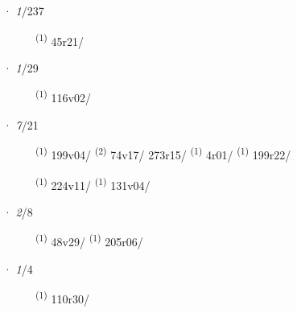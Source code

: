 \ENTRYEND
\noindent{} · \textit{1}/237 \LEMMALINE
\begin{description}
    \item[]  \textsuperscript{(1)} \mbox{45r21/}
\end{description}
\ENTRYEND
\noindent{} · \textit{1}/29 \LEMMALINE
\begin{description}
    \item[]  \textsuperscript{(1)} \mbox{116v02/}
\end{description}
\ENTRYEND
\noindent{} · \textit{7}/21 \LEMMALINE
\begin{description}
    \item[]  \textsuperscript{(1)} \mbox{199v04/} \CASEBREAK {} \textsuperscript{(2)} \mbox{74v17/} \mbox{273r15/} \CASEBREAK {} \textsuperscript{(1)} \mbox{4r01/} \textsuperscript{(1)} \mbox{199r22/}
    \item[]  \textsuperscript{(1)} \mbox{224v11/} \CASEBREAK {} \textsuperscript{(1)} \mbox{131v04/}
\end{description}
\ENTRYEND
\noindent{} · \textit{2}/8 \LEMMALINE
\begin{description}
    \item[]  \textsuperscript{(1)} \mbox{48v29/} \textsuperscript{(1)} \mbox{205r06/}
\end{description}
\ENTRYEND
\noindent{} · \textit{1}/4 \LEMMALINE
\begin{description}
    \item[]  \textsuperscript{(1)} \mbox{110r30/}
\end{description}
